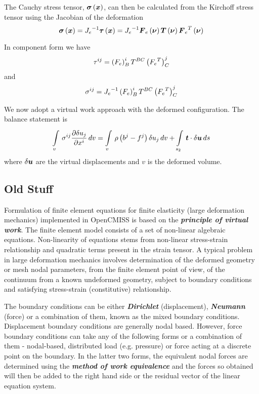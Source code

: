 The Cauchy stress tensor, $ \boldsymbol{\sigma}\left( \boldsymbol{x} \right) $, can then be calculated from the Kirchoff stress
tensor using the Jacobian of the deformation \ie
\begin{equation}
   \boldsymbol{\sigma}\left( \boldsymbol{x} \right) ={J_{e}}^{-1} \boldsymbol{\tau}\left( \boldsymbol{x} \right) ={J_{e}}^{-1}
   \boldsymbol{F}_{e}\left( \boldsymbol{\nu} \right)  \boldsymbol{T}\left( \boldsymbol{\nu} \right)  {\boldsymbol{F}_{e}}^{T}\left( \boldsymbol{\nu} \right) 
\end{equation}

In component form we have
\begin{equation}
  \tau^{ij}=\left( F_{e} \right)^{i}_{B}T^{BC}\left( {F_{e}}^{T} \right)^{j}_{C}
\end{equation}
and
\begin{equation}
  \sigma^{ij}={J_{e}}^{-1}\left( F_{e} \right)^{i}_{B}T^{BC}\left( {F_{e}}^{T} \right)^{j}_{C}
\end{equation}

We now adopt a virtual work approach with the deformed configuration. The
balance statement is
\begin{equation}
    \displaystyle\int\limits_{v}^{} \,\sigma^{ij} \dfrac{\partial \delta
      u_{j}}{\partial x^{i}} \,dv =  \displaystyle\int\limits_{v}^{} \,\rho\left( b^{j}-f^{j} \right)\delta
    u_{j}\,dv +  \displaystyle\int\limits_{s_{2}}^{} \,\boldsymbol{t}\cdot\delta\boldsymbol{u}\,ds 
\end{equation}
where $\delta\boldsymbol{u}$ are the virtual displacements and $v$ is the deformed
volume.

\subsection{Old Stuff}

Formulation of finite element equations for finite elasticity (large
deformation mechanics) implemented in OpenCMISS is based on the
\textit{\textbf{principle of virtual work}}. The finite element model consists
of a set of non-linear algebraic equations. Non-linearity of equations stems
from non-linear stress-strain relationship and quadratic terms present in the
strain tensor. A typical problem in large deformation mechanics involves
determination of the deformed geometry or mesh nodal parameters, from the
finite element point of view, of the continuum from a known undeformed
geometry, subject to boundary conditions and satisfying stress-strain
(constitutive) relationship.
  
The boundary conditions can be either \textit{\textbf{Dirichlet}}
(displacement), \textit{\textbf{Neumann}} (force) or a combination of them,
known as the mixed boundary conditions. Displacement boundary conditions are
generally nodal based. However, force boundary conditions can take any of the
following forms or a combination of them - nodal-based, distributed load
(e.g. pressure) or force acting at a discrete point on the boundary. In the
latter two forms, the equivalent nodal forces are determined using the
\textit{\textbf{method of work equivalence}} \cite{hutton:2004} and the forces
so obtained will then be added to the right hand side or the residual vector
of the linear equation system.

